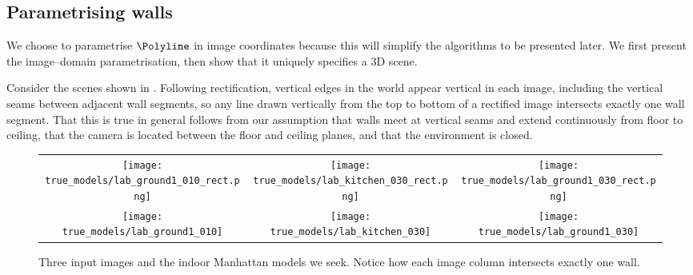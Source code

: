 \subsection{Parametrising walls}

We choose to parametrise $\Polyline$ in image coordinates because this
will simplify the algorithms to be presented later. We first present
the image--domain parametrisation, then show that it uniquely
specifies a 3D scene.

Consider the scenes shown in . Following
rectification, vertical edges in the world appear vertical in each
image, including the vertical seams between adjacent wall segments, so
any line drawn vertically from the top to bottom of a rectified image
intersects exactly one wall segment. That this is true in general
follows from our assumption that walls meet at vertical seams and
extend continuously from floor to ceiling, that the camera is located
between the floor and ceiling planes, and that the environment is
closed.

\begin{figure}[tb]%
  \centering
    \begin{tabular}{ccc}
      \texttt{[image: true\_models/lab\_ground1\_010\_rect.png]} &
      \texttt{[image: true\_models/lab\_kitchen\_030\_rect.png]} &
      \texttt{[image: true\_models/lab\_ground1\_030\_rect.png]}
      \\      
      \texttt{[image: true\_models/lab\_ground1\_010]} &
      \texttt{[image: true\_models/lab\_kitchen\_030]} &
      \texttt{[image: true\_models/lab\_ground1\_030]}
    \end{tabular}
  \caption{Three input images and the indoor Manhattan models we
    seek. Notice how each image column intersects exactly one
    wall.}
  \label{fig:example-scenes}
\end{figure}

